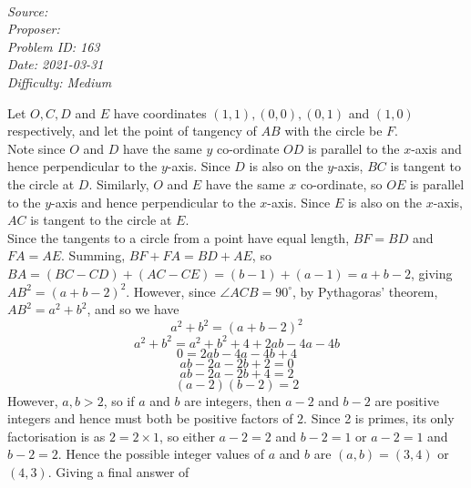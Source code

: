 \SSbreak\\
\emph{Source: \Cop}\\
\emph{Proposer: \Pdenial}\\
\emph{Problem ID: 163}\\
\emph{Date: 2021-03-31}\\
\emph{Difficulty: Medium}\\
\SSbreak

\bigskip

\begin{solution}\hfil\medskip
	
	Let \(O, C, D\) and \(E\) have coordinates \((1,1), (0,0), (0,1)\) and \((1,0)\) respectively, and let the point of tangency of \(AB\) with the circle be \(F\).\\
Note since \(O\) and \(D\) have the same \(y\) co-ordinate \(OD\) is parallel to the \(x\)-axis and hence perpendicular to the \(y\)-axis. Since \(D\) is also on the \(y\)-axis, \(BC\) is tangent to the circle at \(D\). Similarly, \(O\) and \(E\) have the same \(x\) co-ordinate, so \(OE\) is parallel to the \(y\)-axis and hence perpendicular to the \(x\)-axis. Since \(E\) is also on the \(x\)-axis, \(AC\) is tangent to the circle at \(E\).\\
Since the tangents to a circle from a point have equal length, \(BF = BD\) and \(FA = AE\). Summing, \(BF + FA = BD + AE\), so \(BA = (BC - CD) + (AC - CE) = (b-1) + (a-1) = a + b - 2\), giving \(AB^2 = (a+b-2)^2\). However, since \(\angle ACB = 90^{\circ}\), by Pythagoras' theorem, \(AB^2 = a^2 + b^2\), and so we have
\begin{equation*}a^2 + b^2 = (a+b-2)^2\end{equation*}
\begin{equation*}a^2 + b^2 = a^2 + b^2 + 4 + 2ab - 4a - 4b\end{equation*}
\begin{equation*}0 = 2ab - 4a - 4b + 4\end{equation*}
\begin{equation*}ab - 2a - 2b + 2 = 0\end{equation*}
\begin{equation*}ab - 2a - 2b + 4 = 2\end{equation*}
\begin{equation*}(a-2)(b-2) = 2\end{equation*}
However, \(a,b > 2\), so if \(a\) and \(b\) are integers, then \(a-2\) and \(b-2\) are positive integers and hence must both be positive factors of \(2\). Since 2 is primes, its only factorisation is as \(2 = 2 \times 1\), so either \(a-2 = 2\) and \(b-2 = 1\) or \(a-2 = 1\) and \(b-2 = 2\). Hence the possible integer values of \(a\) and \(b\) are \((a,b) = (3,4)\) or \((4,3)\). Giving a final answer of 
\end{solution}\bigskip
